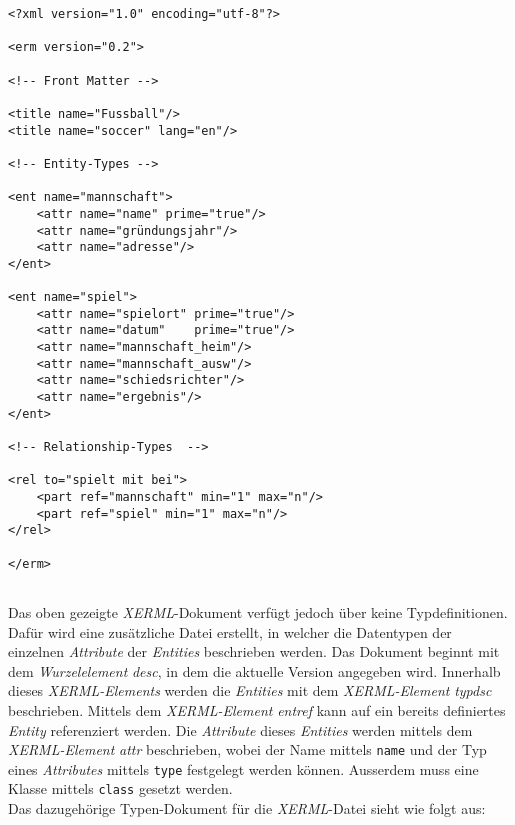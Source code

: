 \begin{verbatim}
<?xml version="1.0" encoding="utf-8"?>

<erm version="0.2">

<!-- Front Matter -->

<title name="Fussball"/>
<title name="soccer" lang="en"/>

<!-- Entity-Types -->
	
<ent name="mannschaft">
    <attr name="name" prime="true"/>
    <attr name="gründungsjahr"/>
    <attr name="adresse"/>
</ent>
	
<ent name="spiel">
    <attr name="spielort" prime="true"/>
    <attr name="datum"    prime="true"/>
    <attr name="mannschaft_heim"/>
    <attr name="mannschaft_ausw"/>
    <attr name="schiedsrichter"/>
    <attr name="ergebnis"/>
</ent>

<!-- Relationship-Types  -->

<rel to="spielt mit bei">
    <part ref="mannschaft" min="1" max="n"/>
    <part ref="spiel" min="1" max="n"/>
</rel>

</erm>
	
\end{verbatim}
\pra
\noindent
Das oben gezeigte \textit{XERML}-Dokument verfügt jedoch über keine Typdefinitionen. Dafür wird eine zusätzliche Datei erstellt, in welcher die Datentypen der einzelnen \textit{Attribute} der \textit{Entities} beschrieben werden. Das Dokument beginnt mit dem \textit{Wurzelelement} \textit{desc}, in dem die aktuelle Version angegeben wird. Innerhalb dieses \textit{XERML-Elements} werden die \textit{Entities} mit dem \textit{XERML-Element} \textit{typdsc} beschrieben. Mittels dem \textit{XERML-Element} \textit{entref} kann auf ein bereits definiertes \textit{Entity} referenziert werden. Die \textit{Attribute} dieses \textit{Entities} werden mittels dem \textit{XERML-Element} \textit{attr} beschrieben, wobei der Name mittels \verb|name| und der Typ eines \textit{Attributes} mittels \verb|type| festgelegt werden können. Ausserdem muss eine Klasse mittels \verb|class| gesetzt werden.
\\

\noindent
Das dazugehörige Typen-Dokument für die \textit{XERML}-Datei sieht wie folgt aus:


